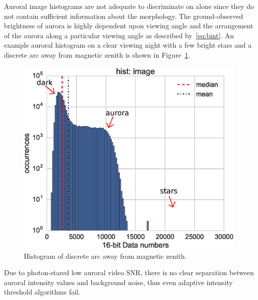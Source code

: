Auroral image histograms are not adequate to discriminate on alone since they do not contain sufficient information about the morphology. 
The ground-observed brightness of aurora is highly dependent upon viewing angle and the arrangement of the aurora along a particular viewing angle as described by~\eqref{eq:bint}.
An example auroral histogram on a clear viewing night with a few bright stars and a discrete arc away from magnetic zenith is shown in Figure~\ref{fig:diffimhist}.
\begin{figure}\centering
    \includegraphics[width=0.7\linewidth]{gfx/diffuse-imhist}
    \caption{Histogram of discrete arc away from magnetic zenith.}\label{fig:diffimhist}
\end{figure}
Due to photon-stared low auroral video SNR, there is no clear separation between auroral intensity values and background noise, thus even adaptive intensity threshold algorithms fail.